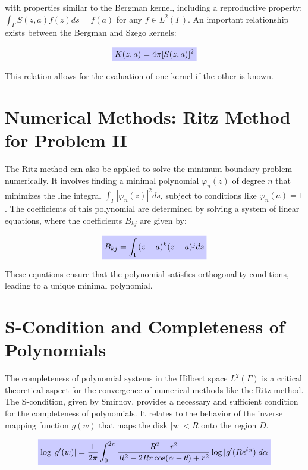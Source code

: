 \documentclass[12pt, a4paper]{report}
\newcommand{\highlight}[2]{\colorbox{#1!20}{$\displaystyle #2$}}
\newcommand{\impformula}[1]{\highlight{blue}{#1}}
\begin{document}
with properties similar to the Bergman kernel, including a reproductive property: $\int_\Gamma S(z,a)f(z)ds = f(a)$ for any $f \in L^2(\Gamma)$. An important relationship exists between the Bergman and Szego kernels:

\begin{equation}
    \impformula{K(z,a) = 4\pi [S(z,a)]^2} \label{eq:bergman_szego_relation}
\end{equation}

This relation allows for the evaluation of one kernel if the other is known.

\section{Numerical Methods: Ritz Method for Problem II}

The Ritz method can also be applied to solve the minimum boundary problem numerically. It involves finding a minimal polynomial $\varphi_n(z)$ of degree $n$ that minimizes the line integral $\int_\Gamma |\varphi_n(z)|^2 ds$, subject to conditions like $\varphi_n(a) = 1$. The coefficients of this polynomial are determined by solving a system of linear equations, where the coefficients $B_{kj}$ are given by:

\begin{equation}
    \impformula{B_{kj} = \int_\Gamma (z-a)^k \overline{(z-a)^j} ds} \label{eq:ritz_coefficients_boundary}
\end{equation}

These equations ensure that the polynomial satisfies orthogonality conditions, leading to a unique minimal polynomial.

\section{S-Condition and Completeness of Polynomials}

The completeness of polynomial systems in the Hilbert space $L^2(\Gamma)$ is a critical theoretical aspect for the convergence of numerical methods like the Ritz method. The S-condition, given by Smirnov, provides a necessary and sufficient condition for the completeness of polynomials. It relates to the behavior of the inverse mapping function $g(w)$ that maps the disk $|w| < R$ onto the region $D$.

\begin{equation}
    \impformula{\log |g'(w)| = \frac{1}{2\pi} \int_0^{2\pi} \frac{R^2 - r^2}{R^2 - 2Rr\cos(\alpha - \theta) + r^2} \log |g'(Re^{i\alpha})| d\alpha} \label{eq:s_condition}
\end{equation}
\end{document}
